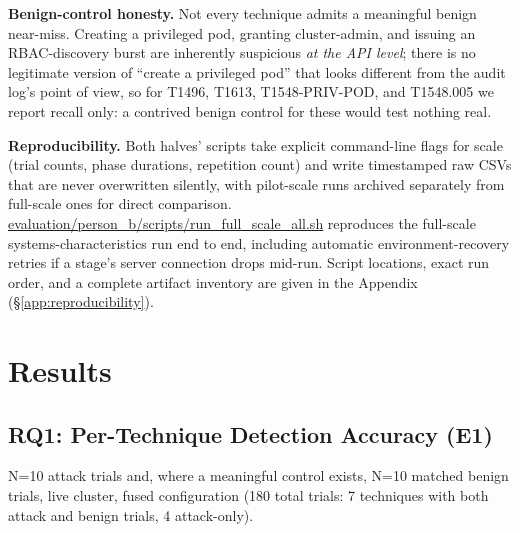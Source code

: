\documentclass{ieeeaccess}
\begin{document}
\textbf{Benign-control honesty.} Not every technique admits a meaningful
benign near-miss. Creating a privileged pod, granting cluster-admin,
and issuing an RBAC-discovery burst are inherently suspicious \emph{at the
API level}; there is no legitimate version of ``create a privileged
pod'' that looks different from the audit log's point of view, so for
T1496, T1613, T1548-PRIV-POD, and T1548.005 we report recall only: a
contrived benign control for these would test nothing real.

\textbf{Reproducibility.} Both halves' scripts take explicit
command-line flags for scale (trial counts, phase durations,
repetition count) and write timestamped raw CSVs that are never
overwritten silently, with pilot-scale runs archived separately from
full-scale ones for direct comparison.
\url{evaluation/person_b/scripts/run_full_scale_all.sh} reproduces the
full-scale systems-characteristics run end to end, including automatic
environment-recovery retries if a stage's server connection drops
mid-run. Script locations, exact run order, and a complete artifact
inventory are given in the Appendix (\S\ref{app:reproducibility}).

\section{Results}
\label{sec:results}

\subsection{RQ1: Per-Technique Detection Accuracy (E1)}
\label{subsec:rq1}

N=10 attack trials and, where a meaningful control exists, N=10 matched
benign trials, live cluster, fused configuration (180 total trials: 7
techniques with both attack and benign trials, 4 attack-only).
\end{document}
